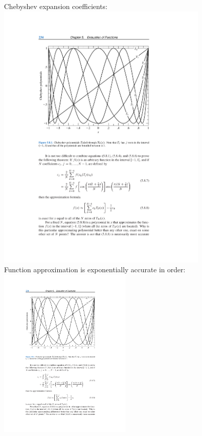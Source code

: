 \documentclass[pdf,ps,8pt]{beamer}
\begin{document}
\begin{frame}[fragile]
\begin{columns}
\begin{column}{0.5\textwidth}
        Chebyshev expansion coefficients:\\
        \includegraphics[width=0.8\textwidth]{ChebyCj.pdf}\\
        Function approximation is exponentially accurate in order:\\
        \includegraphics[width=0.5\textwidth]{ChebyApprox.pdf}
      \end{column}
      \begin{column}{0.5\textwidth}

\end{column}
\end{columns}
\end{frame}
\end{document}

